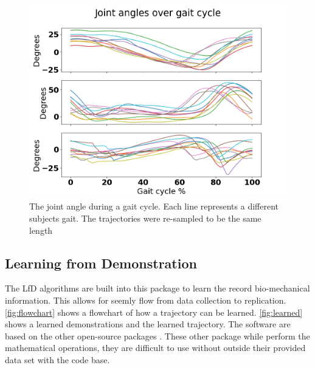 \begin{figure}[h]
   \centering
    \includegraphics[scale=0.5]{images/software/gaitcycle.png}
    \caption[Gait Cycles]{The joint angle during a gait cycle. Each line represents a different subjects gait. The trajectories were re-sampled to be the same length}
    \label{fig:gaitDetection}
\end{figure}



\subsection{Learning from Demonstration}

The LfD algorithms are built into this package to learn the record bio-mechanical information. This allows for seemly flow from data collection to replication. \autoref{fig:flowchart} shows a flowchart of how a trajectory can be learned. \autoref{fig:learned} shows a learned demonstrations and the learned trajectory. The software are based on the other open-source packages \cite{calinon2016tutorial}. These other package while perform the mathematical operations, they are difficult to use without outside their provided data set with the code base. 


